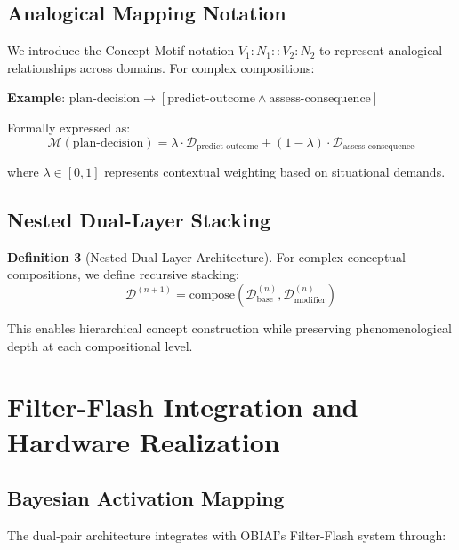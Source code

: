 \documentclass[11pt]{article}
\begin{document}
\subsection{Analogical Mapping Notation}

We introduce the Concept Motif notation $V_1:N_1::V_2:N_2$ to represent analogical relationships across domains. For complex compositions:

\textbf{Example}: $\text{plan-decision} \rightarrow [\text{predict-outcome} \land \text{assess-consequence}]$

Formally expressed as:
\begin{equation}
\mathcal{M}(\text{plan-decision}) = \lambda \cdot \mathcal{D}_{\text{predict-outcome}} + (1-\lambda) \cdot \mathcal{D}_{\text{assess-consequence}}
\end{equation}

where $\lambda \in [0,1]$ represents contextual weighting based on situational demands.

\subsection{Nested Dual-Layer Stacking}

\textbf{Definition 3} (Nested Dual-Layer Architecture). For complex conceptual compositions, we define recursive stacking:
\begin{equation}
\mathcal{D}^{(n+1)} = \text{compose}(\mathcal{D}^{(n)}_{\text{base}}, \mathcal{D}^{(n)}_{\text{modifier}})
\end{equation}

This enables hierarchical concept construction while preserving phenomenological depth at each compositional level.

\section{Filter-Flash Integration and Hardware Realization}

\subsection{Bayesian Activation Mapping}

The dual-pair architecture integrates with OBIAI's Filter-Flash system through:
\end{document}
